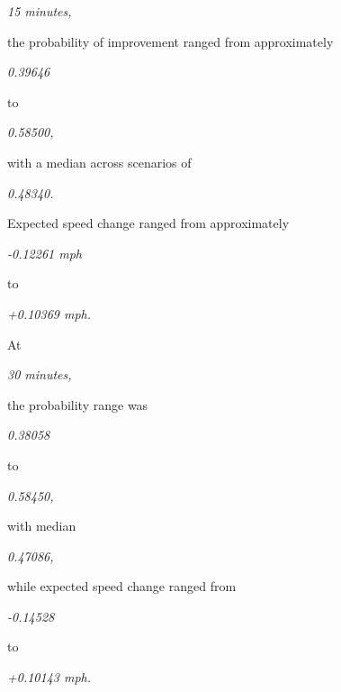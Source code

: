 \begin{center}\textit{15 minutes,}\end{center}

the probability of improvement ranged from approximately

\begin{center}\textit{0.39646}\end{center}

to

\begin{center}\textit{0.58500,}\end{center}

with a median across scenarios of

\begin{center}\textit{0.48340.}\end{center}

Expected speed change ranged from approximately

\begin{center}\textit{-0.12261 mph}\end{center}

to

\begin{center}\textit{+0.10369 mph.}\end{center}

At

\begin{center}\textit{30 minutes,}\end{center}

the probability range was

\begin{center}\textit{0.38058}\end{center}

to

\begin{center}\textit{0.58450,}\end{center}

with median

\begin{center}\textit{0.47086,}\end{center}

while expected speed change ranged from

\begin{center}\textit{-0.14528}\end{center}

to

\begin{center}\textit{+0.10143 mph.}\end{center}

